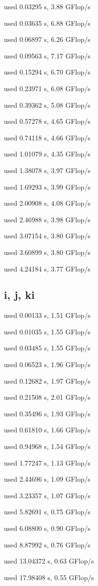 \documentclass[12pt]{article}
\begin{document}
used 0.03295 s, 3.88 GFlop/s

used 0.03635 s, 6.88 GFlop/s

used 0.06897 s, 6.26 GFlop/s

used 0.09563 s, 7.17 GFlop/s

used 0.15294 s, 6.70 GFlop/s

used 0.23971 s, 6.08 GFlop/s

used 0.39362 s, 5.08 GFlop/s

used 0.57278 s, 4.65 GFlop/s

used 0.74118 s, 4.66 GFlop/s

used 1.01079 s, 4.35 GFlop/s

used 1.38078 s, 3.97 GFlop/s

used 1.69293 s, 3.99 GFlop/s

used 2.00908 s, 4.08 GFlop/s

used 2.46988 s, 3.98 GFlop/s

used 3.07154 s, 3.80 GFlop/s

used 3.60899 s, 3.80 GFlop/s

used 4.24184 s, 3.77 GFlop/s

\subsection{i, j, ki}

used 0.00133 s, 1.51 GFlop/s

used 0.01035 s, 1.55 GFlop/s

used 0.03485 s, 1.55 GFlop/s

used 0.06523 s, 1.96 GFlop/s

used 0.12682 s, 1.97 GFlop/s

used 0.21508 s, 2.01 GFlop/s

used 0.35496 s, 1.93 GFlop/s

used 0.61810 s, 1.66 GFlop/s

used 0.94968 s, 1.54 GFlop/s

used 1.77247 s, 1.13 GFlop/s

used 2.44696 s, 1.09 GFlop/s

used 3.23357 s, 1.07 GFlop/s

used 5.82691 s, 0.75 GFlop/s

used 6.08800 s, 0.90 GFlop/s

used 8.87992 s, 0.76 GFlop/s

used 13.04372 s, 0.63 GFlop/s

used 17.98408 s, 0.55 GFlop/s
\end{document}
